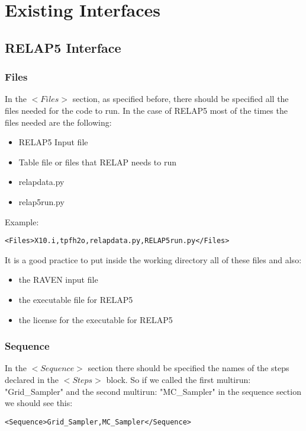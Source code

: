 \section{Existing Interfaces  \\ \vspace{2 mm} {\small }}
\label{sec:existingInterface}
\subsection{RELAP5 Interface}


\subsubsection{Files}
In the $<Files>$ section, as specified before, there should be specified all the files needed for the code to run. In the case of RELAP5 most of the times the files needed are the following:
\begin{itemize}
\item RELAP5 Input file
\item Table file or files that RELAP needs to run
\item relapdata.py
\item relap5run.py
\end{itemize}
Example:
\begin{lstlisting}[style=XML]
<Files>X10.i,tpfh2o,relapdata.py,RELAP5run.py</Files>
\end{lstlisting}

It is a good practice to put inside the working directory all of these files and also:
\begin{itemize}
\item the RAVEN input file
\item the executable file for RELAP5
\item the license for the executable for RELAP5
\end{itemize}
\subsubsection{Sequence}
In the $<Sequence>$ section there should be specified the names of the steps declared in the $<Steps>$ block. 
So if we called the first multirun: "Grid\_Sampler" and the second multirun: "MC\_Sampler" in the sequence section we should see this:
\begin{lstlisting}[style=XML]
<Sequence>Grid_Sampler,MC_Sampler</Sequence>
\end{lstlisting}
